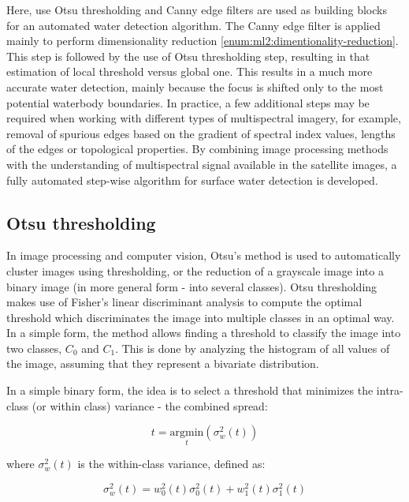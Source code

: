 Here, use Otsu thresholding and Canny edge filters are used as building blocks for an automated water detection algorithm. The Canny edge filter is applied mainly to perform dimensionality reduction \ref{enum:ml2:dimentionality-reduction}. This step is followed by the use of Otsu thresholding step, resulting in that estimation of local threshold versus global one. This results in a much more accurate water detection, mainly because the focus is shifted only to the most potential waterbody boundaries. In practice, a few additional steps may be required when working with different types of multispectral imagery, for example, removal of spurious edges based on the gradient of spectral index values, lengths of the edges or topological properties. By combining image processing methods with the understanding of multispectral signal available in the satellite images, a fully automated step-wise algorithm for surface water detection is developed.

\subsection{Otsu thresholding}
In image processing and computer vision, Otsu's method \citep{otsu1975threshold} is used to automatically cluster images using thresholding, or the reduction of a grayscale image into a binary image (in more general form - into several classes). Otsu thresholding makes use of Fisher's linear discriminant analysis \citep{fisher1936use} to compute the optimal threshold which discriminates the image into multiple classes in an optimal way. In a simple form, the method allows finding a threshold to classify the image into two classes, $C_0$ and $C_1$. This is done by analyzing the histogram of all values of the image, assuming that they represent a bivariate distribution. 

In a simple binary form, the idea is to select a threshold that minimizes the intra-class (or within class) variance - the combined spread:

\begin{equation}
t = \underset{t}{\mathrm{argmin}}\left(\sigma_w^2(t)\right)
\label{eq:otsu-withinclass}
\end{equation}

where $\sigma_w^2(t)$ is the within-class variance, defined as:

\begin{equation}
\sigma_w^2(t) = w_0^2(t) \sigma_0^2(t) + w_1^2(t) \sigma_1^2(t)
\end{equation}

